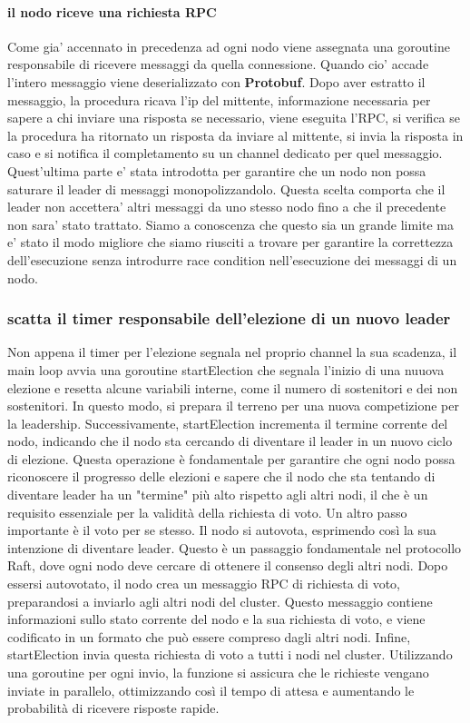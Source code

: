 \paragraph{il nodo riceve una richiesta RPC}
Come gia' accennato in precedenza ad ogni nodo viene assegnata una goroutine responsabile di
ricevere messaggi da quella connessione. Quando cio' accade l'intero messaggio viene deserializzato
con \textbf{Protobuf}.
Dopo aver estratto il messaggio, la procedura ricava l'ip del mittente, informazione necessaria per 
sapere a chi inviare una risposta se necessario,
viene eseguita l'RPC, si verifica se la procedura ha ritornato un risposta da inviare al mittente,
si invia la risposta in caso e si notifica il completamento su un channel dedicato 
per quel messaggio. Quest'ultima parte e' stata introdotta per garantire che un nodo non possa 
saturare il leader di messaggi monopolizzandolo. Questa scelta comporta che il leader non accettera' 
altri messaggi da uno stesso nodo fino a che il precedente non sara' stato trattato. Siamo a 
conoscenza che questo sia un grande limite ma e' stato il modo migliore che siamo riusciti 
a trovare per garantire la correttezza dell'esecuzione senza introdurre race condition nell'esecuzione
dei messaggi di un nodo.

\subsubsection{scatta il timer responsabile dell'elezione di un nuovo leader}
Non appena il timer per l'elezione segnala nel proprio channel la sua scadenza, il main loop avvia una goroutine startElection che segnala l'inizio di una nuuova elezione e resetta alcune variabili interne, come il numero di 
sostenitori e dei non sostenitori. In questo modo, si prepara il terreno per una nuova competizione per la leadership.
Successivamente, startElection incrementa il termine corrente del nodo, indicando che il nodo sta cercando di diventare il leader in un nuovo ciclo di elezione. Questa operazione è fondamentale per garantire che ogni nodo 
possa riconoscere il progresso delle elezioni e sapere che il nodo che sta tentando di diventare leader ha un "termine" più alto rispetto agli altri nodi, il che è un requisito essenziale per la validità della richiesta di voto.
Un altro passo importante è il voto per se stesso. Il nodo si autovota, esprimendo così la sua intenzione di diventare leader. Questo è un passaggio fondamentale nel protocollo Raft, dove ogni nodo deve cercare di ottenere il 
consenso degli altri nodi.
Dopo essersi autovotato, il nodo crea un messaggio RPC di richiesta di voto, preparandosi a inviarlo agli altri nodi del cluster. Questo messaggio contiene informazioni sullo stato corrente del nodo e la sua richiesta di voto, e viene codificato in un formato che può essere compreso dagli altri nodi.
Infine, startElection invia questa richiesta di voto a tutti i nodi nel cluster. Utilizzando una goroutine per ogni invio, la funzione si assicura che le richieste vengano inviate in parallelo, ottimizzando così il tempo di 
attesa e aumentando le probabilità di ricevere risposte rapide.

